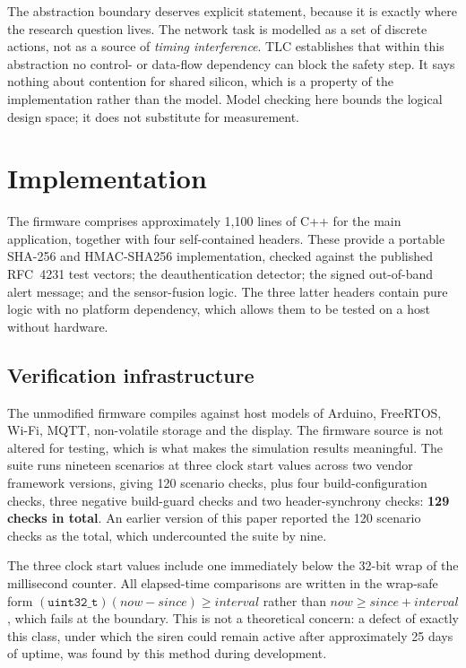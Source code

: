 The abstraction boundary deserves explicit statement, because it is exactly where the research
question lives. The network task is modelled as a set of discrete actions, not as a source of
\emph{timing interference}. TLC establishes that within this abstraction no control- or data-flow
dependency can block the safety step. It says nothing about contention for shared silicon, which
is a property of the implementation rather than the model. Model checking here bounds the logical
design space; it does not substitute for measurement.

\section{Implementation}\label{sec:impl}

The firmware comprises approximately 1{,}100 lines of C++ for the main application, together
with four self-contained headers. These provide a portable SHA-256 and HMAC-SHA256
implementation, checked against the published RFC~4231 test vectors; the deauthentication
detector; the signed out-of-band alert message; and the sensor-fusion logic. The three latter headers contain pure logic with no platform
dependency, which allows them to be tested on a host without hardware.

\subsection{Verification infrastructure}

The unmodified firmware compiles against host models of Arduino, FreeRTOS, Wi-Fi, MQTT,
non-volatile storage and the display. The firmware source is not altered for testing, which is
what makes the simulation results meaningful. The suite runs nineteen scenarios at three clock
start values across two vendor framework versions, giving 120 scenario checks, plus four
build-configuration checks, three negative build-guard checks and two header-synchrony checks:
\textbf{129 checks in total}. An earlier version of this paper reported the 120 scenario checks as
the total, which undercounted the suite by nine.

The three clock start values include one immediately below the 32-bit wrap of the millisecond
counter. All elapsed-time comparisons are written in the wrap-safe form
$(\texttt{uint32\_t})(\mathit{now} - \mathit{since}) \ge \mathit{interval}$ rather than
$\mathit{now} \ge \mathit{since} + \mathit{interval}$, which fails at the boundary. This is not a
theoretical concern: a defect of exactly this class, under which the siren could remain active
after approximately 25 days of uptime, was found by this method during development.

